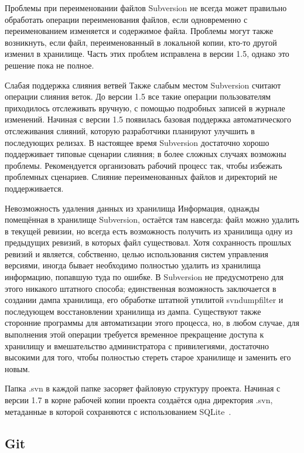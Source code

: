 \documentclass{../industrial-development}
\begin{document}
\lecturenotes

Проблемы при переименовании файлов
Subversion не всегда может правильно обработать операции переименования файлов, если одновременно с переименованием изменяется и содержимое файла. Проблемы могут также возникнуть, если файл, переименованный в локальной копии, кто-то другой изменил в хранилище. Часть этих проблем исправлена в версии 1.5, однако это решение пока не полное.

Слабая поддержка слияния ветвей
Также слабым местом Subversion считают операции слияния веток. До версии 1.5 все такие операции пользователям приходилось отслеживать вручную, с помощью подробных записей в журнале изменений. Начиная с версии 1.5 появилась базовая поддержка автоматического отслеживания слияний, которую разработчики планируют улучшить в последующих релизах. В настоящее время Subversion достаточно хорошо поддерживает типовые сценарии слияния; в более сложных случаях возможны проблемы. Рекомендуется организовать рабочий процесс так, чтобы избежать проблемных сценариев. Слияние переименованных файлов и директорий не поддерживается.

Невозможность удаления данных из хранилища
Информация, однажды помещённая в хранилище Subversion, остаётся там навсегда: файл можно удалить в текущей ревизии, но всегда есть возможность получить из хранилища одну из предыдущих ревизий, в которых файл существовал. Хотя сохранность прошлых ревизий и является, собственно, целью использования систем управления версиями, иногда бывает необходимо полностью удалить из хранилища информацию, попавшую туда по ошибке. В Subversion не предусмотрено для этого никакого штатного способа; единственная возможность заключается в создании дампа хранилища, его обработке штатной утилитой svndumpfilter и последующем восстановлении хранилища из дампа. Существуют также сторонние программы для автоматизации этого процесса, но, в любом случае, для выполнения этой операции требуется временное прекращение доступа к хранилищу и вмешательство администратора с привилегиями, достаточно высокими для того, чтобы полностью стереть старое хранилище и заменить его новым.

Папка .svn в каждой папке
засоряет файловую структуру проекта. Начиная с версии 1.7 в корне рабочей копии проекта создаётся одна директория .svn, метаданные в которой сохраняются с использованием SQLite~\cite{SVNWikipedia}.

\subsection{Git}
\end{document}
